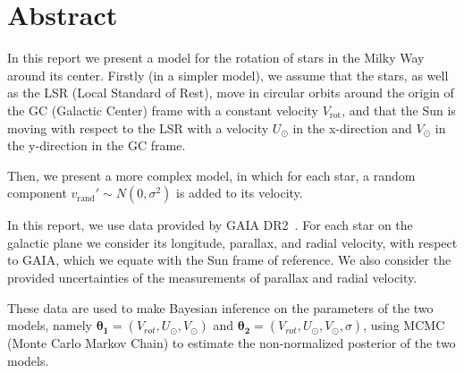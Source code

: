 \section*{Abstract}

In this report we present a model for the rotation of stars in the Milky Way around its center.
Firstly (in a simpler model), we assume that the stars, as well as the LSR (Local Standard of Rest), 
move in circular orbits around the origin of the GC (Galactic Center) frame with a constant velocity $V_{\text{rot}}$, 
and that the Sun is moving with respect to the LSR 
with a velocity $U_{\odot}$ in the x-direction and $V_{\odot}$ in the y-direction in the GC frame. 

Then, we present a more complex model, in which for each star, 
a random component $v_{\text{rand}}' \sim N(0, \sigma^2)$ is added to its velocity.



In this report, we use data provided by GAIA DR2~\cite{GAIADR2}.
For each star on the galactic plane we consider its longitude, parallax, and radial velocity,
with respect to GAIA, which we equate with the Sun frame of reference.
We also consider the provided uncertainties of the measurements of parallax and radial velocity.

These data are used to make Bayesian inference on the parameters of the two models, namely $\mathbf{\theta_1} = (V_{rot}, U_{\odot}, V_{\odot})$ and $\mathbf{\theta_2} = (V_{rot}, U_{\odot}, V_{\odot}, \sigma)$, using MCMC (Monte Carlo Markov Chain) to estimate the non-normalized posterior of the two models. 

